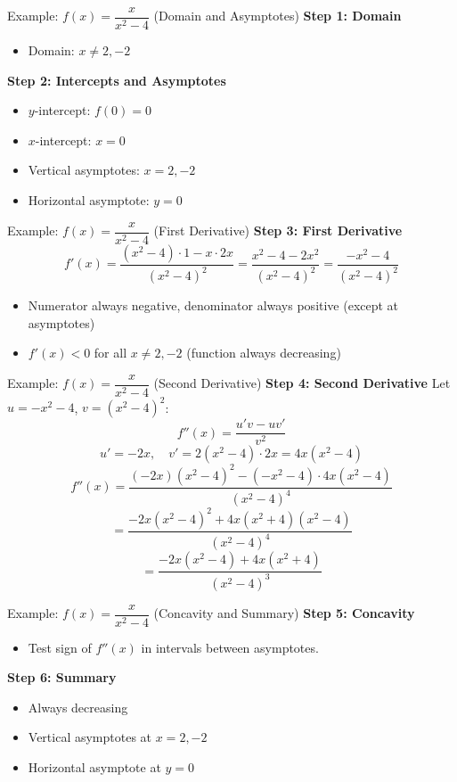 \documentclass[aspectratio=169]{beamer}
\begin{document}
\begin{frame}{Example: $f(x) = \dfrac{x}{x^2-4}$ (Domain and Asymptotes)}
\textbf{Step 1: Domain}
\begin{itemize}
    \item Domain: $x\neq 2, -2$
\end{itemize}
\textbf{Step 2: Intercepts and Asymptotes}
\begin{itemize}
    \item $y$-intercept: $f(0)=0$
    \item $x$-intercept: $x=0$
    \item Vertical asymptotes: $x=2, -2$
    \item Horizontal asymptote: $y=0$
\end{itemize}
\end{frame}

\begin{frame}{Example: $f(x) = \dfrac{x}{x^2-4}$ (First Derivative)}
\textbf{Step 3: First Derivative}
\[
    f'(x) = \frac{(x^2-4)\cdot 1 - x\cdot 2x}{(x^2-4)^2} = \frac{x^2-4-2x^2}{(x^2-4)^2} = \frac{-x^2-4}{(x^2-4)^2}
\]
\begin{itemize}
    \item Numerator always negative, denominator always positive (except at asymptotes)
    \item $f'(x)<0$ for all $x\neq 2, -2$ (function always decreasing)
\end{itemize}
\end{frame}

\begin{frame}{Example: $f(x) = \dfrac{x}{x^2-4}$ (Second Derivative)}
\textbf{Step 4: Second Derivative}
Let $u = -x^2-4$, $v = (x^2-4)^2$:
\[
    f''(x) = \frac{u'v - uv'}{v^2}
\]
\[
    u' = -2x, \quad v' = 2(x^2-4)\cdot 2x = 4x(x^2-4)
\]
\[
    f''(x) = \frac{(-2x)(x^2-4)^2 - (-x^2-4)\cdot 4x(x^2-4)}{(x^2-4)^4}
\]
\[
    = \frac{-2x(x^2-4)^2 + 4x(x^2+4)(x^2-4)}{(x^2-4)^4}
\]
\[
    = \frac{-2x(x^2-4) + 4x(x^2+4)}{(x^2-4)^3}
\]
\end{frame}

\begin{frame}{Example: $f(x) = \dfrac{x}{x^2-4}$ (Concavity and Summary)}
\textbf{Step 5: Concavity}
\begin{itemize}
    \item Test sign of $f''(x)$ in intervals between asymptotes.
\end{itemize}
\textbf{Step 6: Summary}
\begin{itemize}
    \item Always decreasing
    \item Vertical asymptotes at $x=2, -2$
    \item Horizontal asymptote at $y=0$
\end{itemize}
\end{frame}
\end{document}
